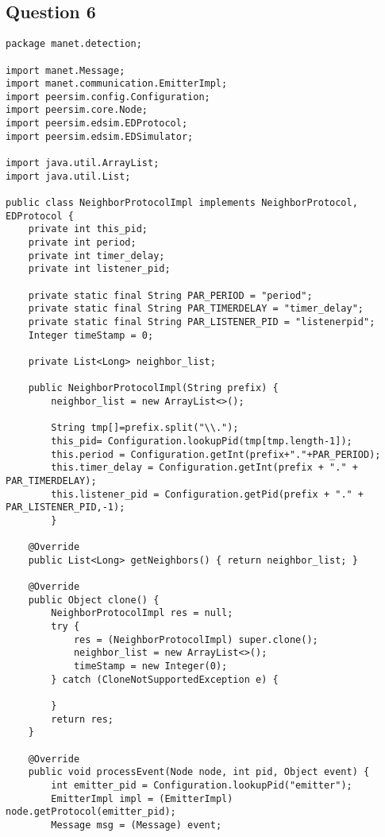 \documentclass[a4paper]{article}
\begin{document}
\pagebreak

\subsection{Question 6}


\begin{verbatim}
package manet.detection;

import manet.Message;
import manet.communication.EmitterImpl;
import peersim.config.Configuration;
import peersim.core.Node;
import peersim.edsim.EDProtocol;
import peersim.edsim.EDSimulator;

import java.util.ArrayList;
import java.util.List;

public class NeighborProtocolImpl implements NeighborProtocol, EDProtocol {
    private int this_pid;
    private int period;
    private int timer_delay;
    private int listener_pid;

    private static final String PAR_PERIOD = "period";
    private static final String PAR_TIMERDELAY = "timer_delay";
    private static final String PAR_LISTENER_PID = "listenerpid";
    Integer timeStamp = 0;

    private List<Long> neighbor_list;

    public NeighborProtocolImpl(String prefix) {
        neighbor_list = new ArrayList<>();

        String tmp[]=prefix.split("\\.");
        this_pid= Configuration.lookupPid(tmp[tmp.length-1]);
        this.period = Configuration.getInt(prefix+"."+PAR_PERIOD);
        this.timer_delay = Configuration.getInt(prefix + "." + PAR_TIMERDELAY);
        this.listener_pid = Configuration.getPid(prefix + "." + PAR_LISTENER_PID,-1);
        }

    @Override
    public List<Long> getNeighbors() { return neighbor_list; }

    @Override
    public Object clone() {
        NeighborProtocolImpl res = null;
        try {
            res = (NeighborProtocolImpl) super.clone();
            neighbor_list = new ArrayList<>();
            timeStamp = new Integer(0);
        } catch (CloneNotSupportedException e) {

        }
        return res;
    }

    @Override
    public void processEvent(Node node, int pid, Object event) {
        int emitter_pid = Configuration.lookupPid("emitter");
        EmitterImpl impl = (EmitterImpl) node.getProtocol(emitter_pid);
        Message msg = (Message) event;


\end{verbatim}
\end{document}
